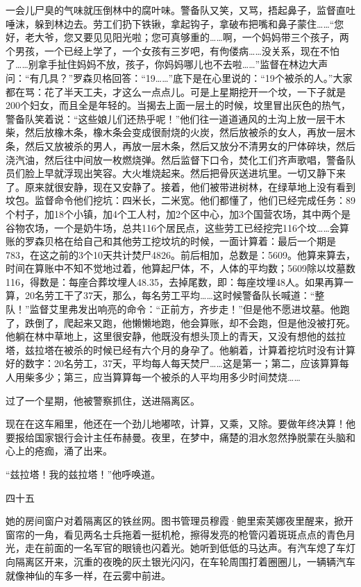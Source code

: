 一会儿尸臭的气味就压倒林中的腐叶味。警备队又笑，又骂，捂起鼻子，监督直吐唾沫，躲到林边去。劳工们扔下铁锹，拿起钩子，拿破布把嘴和鼻子蒙住……“您好，老大爷，您又要见见阳光啦；您可真够重的……啊，一个妈妈带三个孩子，两个男孩，一个已经上学了，一个女孩有三岁吧，有佝偻病……没关系，现在不怕了……别拿手扯住妈妈不放，孩子，你妈妈哪儿也不去啦……”监督在林边大声问：“有几具？”罗森贝格回答：“19……”底下是在心里说的：“19个被杀的人。”大家都在骂：花了半天工夫，才这么一点点儿。可是上星期挖开一个坟，一下子就是200个妇女，而且全是年轻的。当揭去上面一层土的时候，坟里冒出灰色的热气，警备队笑着说：“这些娘儿们还热乎呢！”他们往一道道通风的土沟上放一层干木柴，然后放橡木条，橡木条会变成很耐烧的火炭，然后放被杀的女人，再放一层木条，然后又放被杀的男人，再放一层木条，然后又放分不清男女的尸体碎块，然后浇汽油，然后往中间放一枚燃烧弹。然后监督下口令，焚化工们齐声歌唱，警备队员们脸上早就浮现出笑容。大火堆烧起来。然后把骨灰送进坑里。一切又静下来了。原来就很安静，现在又安静了。接着，他们被带进树林，在绿草地上没有看到坟包。监督命令他们挖坑：四米长，二米宽。他们都懂了，他们已经完成任务：89个村子，加18个小镇，加4个工人村，加2个区中心，加3个国营农场，其中两个是谷物农场，一个是奶牛场，总共116个居民点，这些劳工已经挖完116个坟……会算账的罗森贝格在给自己和其他劳工挖坟坑的时候，一面计算着：最后一个期是783，在这之前的3个10天共计焚尸4826。前后相加，总数是：5609。他算来算去，时间在算账中不知不觉地过着，他算起尸体，不，人体的平均数；5609除以坟墓数116，得数是：每座合葬坟埋人48.35，去掉尾数，即：每座坟埋48人。如果再算一算，20名劳工干了37天，那么，每名劳工平均……这时候警备队长喊道：“整队！”监督艾里弗发出响亮的命令：“正前方，齐步走！”但是他不愿进坟墓。他跑了，跌倒了，爬起来又跑，他懒懒地跑，他会算账，却不会跑，但是他没被打死。他躺在林中草地上，这里很安静，他既没有想头顶上的青天，又没有想他的兹拉塔，兹拉塔在被杀的时候已经有六个月的身孕了。他躺着，计算着挖坑时没有计算好的数字：20名劳工，37天，平均每人每天焚尸……这是第一；第二，应该算算每人用柴多少；第三，应当算算每一个被杀的人平均用多少时间焚烧……

过了一个星期，他被警察抓住，送进隔离区。

现在在这车厢里，他还在一个劲儿地嘟哝，计算，又乘，又除。要做年终决算！他要报给国家银行会计主任布赫曼。夜里，在梦中，痛楚的泪水忽然挣脱蒙在头脑和心上的疮痂，涌了出来。

“兹拉塔！我的兹拉塔！”他呼唤道。

四十五

她的房间窗户对着隔离区的铁丝网。图书管理员穆霞·鲍里索芙娜夜里醒来，掀开窗帘的一角，看见两名士兵拖着一挺机枪，擦得发亮的枪管闪着斑斑点点的青色月光，走在前面的一名军官的眼镜也闪着光。她听到低低的马达声。有汽车熄了车灯向隔离区开来，沉重的夜晚的灰土银光闪闪，在车轮周围打着圈圈儿，一辆辆汽车就像神仙的车多一样，在云雾中前进。

